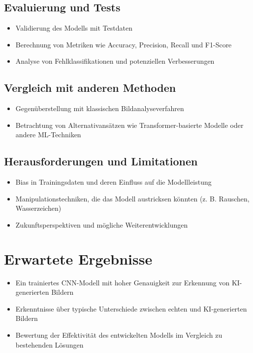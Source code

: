 \documentclass[a4paper,12pt]{article}
\begin{document}
\subsection{Evaluierung und Tests}

\begin{itemize}
    \item Validierung des Modells mit Testdaten
    \item Berechnung von Metriken wie Accuracy, Precision, Recall und F1-Score
    \item Analyse von Fehlklassifikationen und potenziellen Verbesserungen
\end{itemize}

\subsection{Vergleich mit anderen Methoden}

\begin{itemize}
    \item Gegenüberstellung mit klassischen Bildanalyseverfahren
    \item Betrachtung von Alternativansätzen wie Transformer-basierte Modelle oder andere ML-Techniken
\end{itemize}

\subsection{Herausforderungen und Limitationen}

\begin{itemize}
    \item Bias in Trainingsdaten und deren Einfluss auf die Modellleistung
    \item Manipulationstechniken, die das Modell austricksen könnten (z. B. Rauschen, Wasserzeichen)
    \item Zukunftsperspektiven und mögliche Weiterentwicklungen
\end{itemize}

\section{Erwartete Ergebnisse}

\begin{itemize}
    \item Ein trainiertes CNN-Modell mit hoher Genauigkeit zur Erkennung von KI-generierten Bildern
    \item Erkenntnisse über typische Unterschiede zwischen echten und KI-generierten Bildern
    \item Bewertung der Effektivität des entwickelten Modells im Vergleich zu bestehenden Lösungen
\end{itemize}
\end{document}
